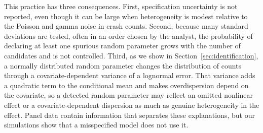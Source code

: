 This practice has three consequences. First, specification uncertainty is not reported, even though it can be large when heterogeneity is modest relative to the Poisson and gamma noise in crash counts. Second, because many standard deviations are tested, often in an order chosen by the analyst, the probability of declaring at least one spurious random parameter grows with the number of candidates and is not controlled. Third, as we show in Section~\ref{sec:identification}, a normally distributed random parameter changes the distribution of counts through a covariate-dependent variance of a lognormal error. That variance adds a quadratic term to the conditional mean and makes overdispersion depend on the covariate, so a detected random parameter may reflect an omitted nonlinear effect or a covariate-dependent dispersion as much as genuine heterogeneity in the effect. Panel data contain information that separates these explanations, but our simulations show that a misspecified model does not use it.

